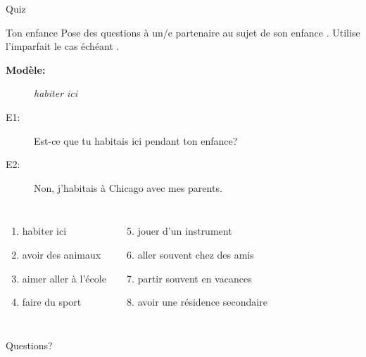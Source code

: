 \documentclass{beamer}
\begin{document}
  \begin{frame}{}
    \begin{center}
      \Large Quiz
    \end{center}
  \end{frame}

  \begin{frame}{Ton enfance}
    Pose des questions à un/e partenaire au sujet de son enfance .
    Utilise l'imparfait le cas échéant .
    \begin{description}
      \item[\textbf{Modèle:}] \textit{habiter ici}
      \item[E1:] Est-ce que tu habitais ici pendant ton enfance?
      \item[E2:] Non, j'habitais à Chicago avec mes parents.
    \end{description}
    \begin{columns}[t]
        \begin{enumerate}
          \item habiter ici
          \item avoir des animaux
          \item aimer aller à l'école
          \item faire du sport
        \end{enumerate}
        \begin{enumerate}
          \setcounter{enumi}{4}
          \item jouer d'un instrument
          \item aller souvent chez des amis
          \item partir souvent en vacances
          \item avoir une résidence secondaire
        \end{enumerate}
    \end{columns}
  \end{frame}

  \begin{frame}{}
    \begin{center}
      \Large Questions?
    \end{center}
  \end{frame}
\end{document}
